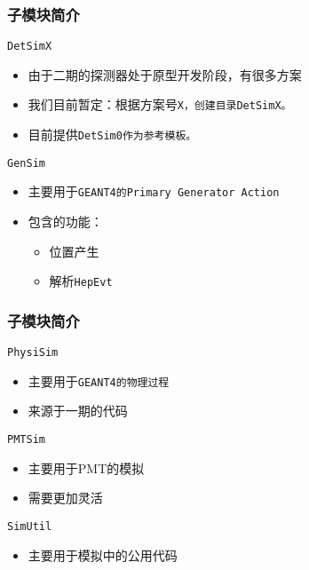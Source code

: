 \begin{frame}
    \frametitle{子模块简介}
    \begin{block}{\tt{DetSimX}}
        \begin{itemize}    
            \item 由于二期的探测器处于原型开发阶段，有很多方案
            \item 我们目前暂定：根据方案号\tt{X}，创建目录\tt{DetSimX}。
            \item 目前提供\tt{DetSim0}作为参考模板。
        \end{itemize}
    \end{block}
    \begin{block}{\tt{GenSim}}
    \begin{itemize}    
        \item 主要用于\tt{GEANT4}的\tt{Primary Generator Action}
        \item 包含的功能：
            \begin{itemize}    
                \item 位置产生
                \item 解析\tt{HepEvt}
            \end{itemize}
    \end{itemize}
    \end{block}
\end{frame}

\begin{frame}
    \frametitle{子模块简介}
    \begin{block}{\tt{PhysiSim}}
        \begin{itemize}    
            \item 主要用于\tt{GEANT4}的物理过程
            \item 来源于一期的代码
        \end{itemize}
    \end{block}

    \begin{block}{\tt{PMTSim}}
        \begin{itemize}    
            \item 主要用于PMT的模拟
            \item 需要更加灵活
        \end{itemize}
    \end{block}

    \begin{block}{\tt{SimUtil}}
        \begin{itemize}    
            \item 主要用于模拟中的公用代码
        \end{itemize}
    \end{block}
\end{frame}
